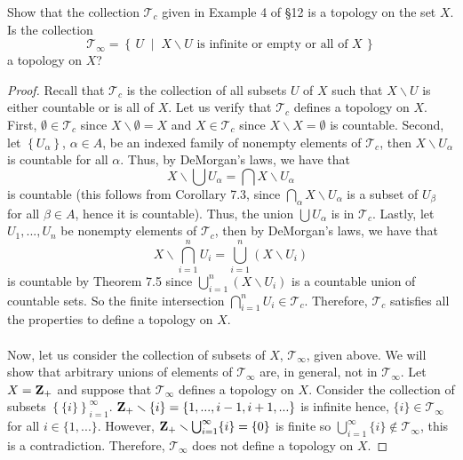 \begin{problem}[Munkres, \S13, 3.]
Show that the collection $\mathcal{T}_c$ given in
Example 4 of \S12 is a topology on the set $X$. Is the collection
\[
\mathcal{T}_\infty=
\left\{\,U\;\middle|\;
\text{$X\smallsetminus U$ is infinite or empty or all of $X$}
\,\right\}
\]
a topology on $X$?
\end{problem}
\begin{proof}
Recall that $\mathcal{T}_c$ is the collection of all subsets $U$
of $X$ such that $X\smallsetminus U$ is either countable or is
all of $X$. Let us verify that $\mathcal{T}_c$ defines a topology
on $X$. First, $\emptyset\in\mathcal{T}_c$ since
$X\smallsetminus\emptyset=X$ and $X\in\mathcal{T}_c$ since
$X\smallsetminus X=\emptyset$ is countable. Second, let
$\left\{U_\alpha\right\}$, $\alpha\in A$, be an indexed
family of nonempty elements of $\mathcal{T}_c$, then
$X\smallsetminus U_\alpha$ is countable for all $\alpha$. Thus,
by DeMorgan's laws, we have that
\[
X\smallsetminus\bigcup U_\alpha=\bigcap X\smallsetminus U_\alpha
\]
is countable (this follows from Corollary 7.3, since
$\bigcap_\alpha X\smallsetminus U_\alpha$ is a subset of
$U_\beta$ for all $\beta\in A$, hence it is countable). Thus, the
union $\bigcup U_\alpha$ is in $\mathcal{T}_c$. Lastly, let
$U_1,...,U_n$ be nonempty elements of $\mathcal{T}_c$, then by
DeMorgan's laws, we have that
\[
X\smallsetminus\bigcap_{i=1}^n U_i=\bigcup_{i=1}^n (X\smallsetminus U_i)
\]
is countable by Theorem 7.5 since
$\bigcup_{i=1}^n(X\smallsetminus U_i)$ is a countable union of
countable sets. So the finite intersection
$\bigcap_{i=1}^nU_i\in\mathcal{T}_c$. Therefore, $\mathcal{T}_c$
satisfies all the properties to define a topology on $X$.
\\\\
Now, let us consider the collection of subsets of $X$,
$\mathcal{T}_\infty$, given above. We will show that arbitrary
unions of elements of $\mathcal{T}_\infty$ are, in general, not
in $\mathcal{T}_\infty$. Let $X=\mathbf{Z}_+$ and suppose that
$\mathcal{T}_\infty$ defines a topology on $X$. Consider the
collection of subsets
$\left\{\{i\}\right\}_{i=1}^\infty$. $\mathbf{Z}_+\smallsetminus\{i\}=\left\{1,...,i-1,i+1,...\right\}$
is infinite hence, $\{i\}\in\mathcal{T}_\infty$ for all
$i\in\{1,...\}$. However,
$\mathbf{Z}_+\smallsetminus\bigcup_{i=1}^\infty\{i\}=\{0\}$ is finite so
$\bigcup_{i=1}^\infty\{i\}\notin\mathcal{T}_\infty$, this is a
contradiction. Therefore, $\mathcal{T}_\infty$ does not define a
topology on $X$.
\end{proof}
\newpage

